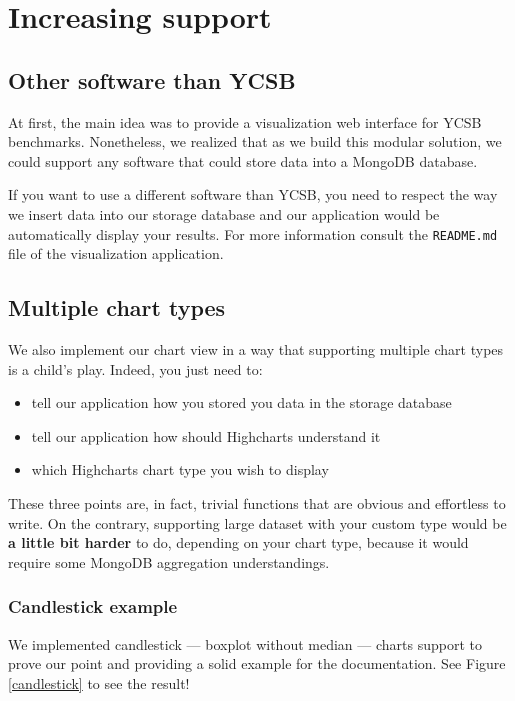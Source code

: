 \documentclass[a4paper,11pt]{report}
\begin{document}
\section{Increasing support}

\subsection{Other software than YCSB}

At first, the main idea was to provide a visualization web interface for YCSB benchmarks. Nonetheless, we realized that as we build this modular solution, we could support any software that could store data into a MongoDB database.

If you want to use a different software than YCSB, you need to respect the way we insert data into our storage database and our application would be automatically display your results. For more information consult the \texttt{README.md} file of the visualization application.

\subsection{Multiple chart types}

We also implement our chart view in a way that supporting multiple chart types is a child's play. Indeed, you just need to:

\begin{itemize}
\item
tell our application how you stored you data in the storage database
\item
tell our application how should Highcharts understand it
\item
which Highcharts chart type you wish to display
\end{itemize}

These three points are, in fact, trivial functions that are obvious and effortless to write. On the contrary, supporting large dataset with your custom type would be \textbf{a little bit harder} to do, depending on your chart type, because it would require some MongoDB aggregation understandings.

\subsubsection{Candlestick example}

We implemented candlestick --- boxplot without median --- charts support to prove our point and providing a solid example for the documentation. See Figure \ref{candlestick} to see the result!
\end{document}
